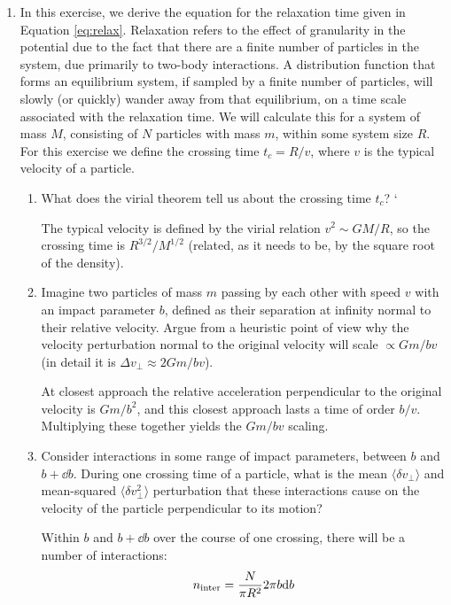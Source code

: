 \begin{enumerate}
\item In this exercise, we derive the equation for the relaxation time
given in Equation \ref{eq:relax}. Relaxation refers to the effect of
granularity in the potential due to the fact that there are a finite
number of particles in the system, due primarily to two-body
interactions. A distribution function that forms an equilibrium
system, if sampled by a finite number of particles, will slowly (or
quickly) wander away from that equilibrium, on a time scale associated
with the relaxation time. We will calculate this for a system of mass
$M$, consisting of $N$ particles with mass $m$, within some system
size $R$. For this exercise we define the crossing time $t_c=R/v$,
where $v$ is the typical velocity of a particle.
\begin{enumerate}
\item What does the virial theorem tell us about the crossing time
$t_c$?
`
\begin{answer}
The typical velocity is defined by the virial relation $v^2\sim GM/R$,
so the crossing time is $R^{3/2}/M^{1/2}$ (related, as it needs to be,
by the square root of the density).
\end{answer}

\item \label{q:deflection}
Imagine two particles of mass $m$ passing by each other with
speed $v$ with an impact parameter $b$, defined as their separation at
infinity normal to their relative velocity. Argue from a heuristic
point of view why the velocity perturbation normal to the original
velocity will scale $\propto Gm/bv$ (in detail it is $\Delta
v_\perp \approx 2Gm/bv$).

\begin{answer}
At closest approach the relative acceleration perpendicular to the
original velocity is $Gm/b^2$, and this closest approach lasts a time
of order $b/v$. Multiplying these together yields the $Gm/bv$ scaling.
\end{answer}

\item Consider interactions in some range of impact parameters,
between $b$ and $b+\dd{b}$. During one crossing time of a particle,
what is the mean $\langle \delta v_\perp\rangle$ and mean-squared
$\langle \delta v_\perp^2\rangle$ perturbation that these
interactions cause on the velocity of the particle perpendicular to
its motion?

\begin{answer}
Within $b$ and $b+\dd{b}$ over the course of one crossing, there will
be a number of interactions:
\begin{equation}
n_{\rm inter} = \frac{N}{\pi R^2} 2\pi b {\rm d}b
\end{equation}


\end{answer}
\end{enumerate}
\end{enumerate}

